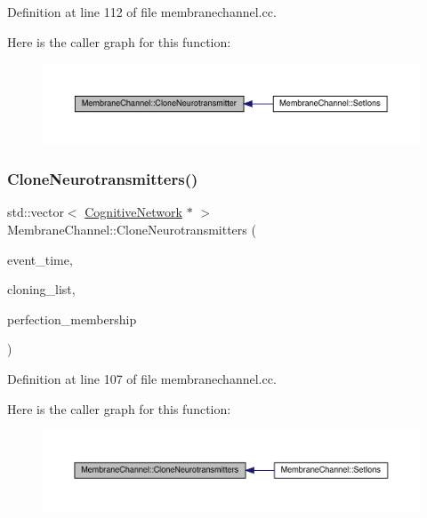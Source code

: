 Definition at line 112 of file membranechannel.\+cc.

Here is the caller graph for this function\+:\nopagebreak
\begin{figure}[H]
\begin{center}
\leavevmode
\includegraphics[width=350pt]{class_membrane_channel_af667720bd2214ea3a1e6d272b57d3a79_icgraph}
\end{center}
\end{figure}
\mbox{\label{class_membrane_channel_a6426185a0d73c967adcb72e3a22b48b0}} 
\subsubsection{\texorpdfstring{Clone\+Neurotransmitters()}{CloneNeurotransmitters()}}
{\footnotesize\ttfamily std\+::vector$<$ \hyperlink{class_cognitive_network}{Cognitive\+Network} $\ast$ $>$ Membrane\+Channel\+::\+Clone\+Neurotransmitters (\begin{DoxyParamCaption}\item[{std\+::chrono\+::time\+\_\+point$<$ \hyperlink{universe_8h_a0ef8d951d1ca5ab3cfaf7ab4c7a6fd80}{Clock} $>$}]{event\+\_\+time,  }\item[{std\+::vector$<$ \hyperlink{class_cognitive_network}{Cognitive\+Network} $\ast$$>$}]{cloning\+\_\+list,  }\item[{double}]{perfection\+\_\+membership }\end{DoxyParamCaption})}



Definition at line 107 of file membranechannel.\+cc.

Here is the caller graph for this function\+:\nopagebreak
\begin{figure}[H]
\begin{center}
\leavevmode
\includegraphics[width=350pt]{class_membrane_channel_a6426185a0d73c967adcb72e3a22b48b0_icgraph}
\end{center}
\end{figure}
\mbox{\label{class_membrane_channel_a67496ca67ad3ecae38f6b987547b1b99}} 
